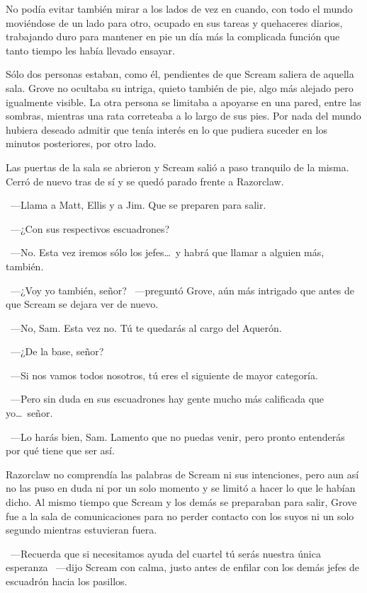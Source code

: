 No podía evitar también mirar a los lados de vez en cuando, con todo el mundo moviéndose de un lado para otro, ocupado en sus tareas y quehaceres diarios, trabajando duro para mantener en pie un día más la complicada función que tanto tiempo les había llevado ensayar.

Sólo dos personas estaban, como él, pendientes de que Scream saliera de aquella sala. Grove no ocultaba su intriga, quieto también de pie, algo más alejado pero igualmente visible. La otra persona se limitaba a apoyarse en una pared, entre las sombras, mientras una rata correteaba a lo largo de sus pies. Por nada del mundo hubiera deseado admitir que tenía interés en lo que pudiera suceder en los minutos posteriores, por otro lado.

Las puertas de la sala se abrieron y Scream salió a paso tranquilo de la misma. Cerró de nuevo tras de sí y se quedó parado frente a Razorclaw.

~---Llama a Matt, Ellis y a Jim. Que se preparen para salir.

~---¿Con sus respectivos escuadrones?

~---No. Esta vez iremos sólo los jefes\dots\ y habrá que llamar a alguien más, también.

~---¿Voy yo también, señor? ~---preguntó Grove, aún más intrigado que antes de que Scream se dejara ver de nuevo.

~---No, Sam. Esta vez no. Tú te quedarás al cargo del Aquerón.

~---¿De la base, señor?

~---Si nos vamos todos nosotros, tú eres el siguiente de mayor categoría.

~---Pero sin duda en sus escuadrones hay gente mucho más calificada que yo\dots\ señor.

~---Lo harás bien, Sam. Lamento que no puedas venir, pero pronto entenderás por qué tiene que ser así.

Razorclaw no comprendía las palabras de Scream ni sus intenciones, pero aun así no las puso en duda ni por un solo momento y se limitó a hacer lo que le habían dicho. Al mismo tiempo que Scream y los demás se preparaban para salir, Grove fue a la sala de comunicaciones para no perder contacto con los suyos ni un solo segundo mientras estuvieran fuera.

~---Recuerda que si necesitamos ayuda del cuartel tú serás nuestra única esperanza ~---dijo Scream con calma, justo antes de enfilar con los demás jefes de escuadrón hacia los pasillos.


